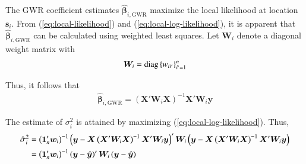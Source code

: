 \documentclass[authoryear, review, 11pt]{elsarticle}
\begin{document}
	The GWR coefficient estimates $\hat{\bm{\beta}}_{i,\text{GWR}}$ maximize the local likelihood at location $\bm{s}_i$. From (\ref{eq:local-likelihood}) and (\ref{eq:local-log-likelihood}), it is apparent that $\hat{\bm{\beta}}_{i,\text{GWR}}$ can be calculated using weighted least squares. Let $\bm{W}_i$ denote a diagonal weight matrix with
	\begin{align}
		\bm{W}_i =  {\rm diag}\left\{w_{ii'}\right\}_{i' = 1}^n
	\end{align}
	
	Thus, it follows that
	\begin{align}
		\hat{\bm{\beta}}_{i, \text{GWR}} = \left( \bm{X}'\bm{W}_i\bm{X} \right)^{-1} \bm{X}'\bm{W}_i\bm{y}
	\end{align}
	
	The estimate of $\sigma_i^2$ is attained by maximizing (\ref{eq:local-log-likelihood}). Thus,
	\begin{align}
		\hat{\sigma}^2_i &= \left(\bm{1}_n'\bm{w}_i \right)^{-1} \left(\bm{y}-\bm{X}\left(\bm{X}'\bm{W}_i\bm{X}\right)^{-1}\bm{X}'\bm{W}_i\bm{y}\right)' \bm{W}_i \left(\bm{y}-\bm{X}\left(\bm{X}'\bm{W}_i\bm{X}\right)^{-1}\bm{X}'\bm{W}_i\bm{y}\right) \notag \\
		&= \left(\bm{1}_n'\bm{w}_i \right)^{-1}  \left(\bm{y}-\hat{\bm{y}}\right)' \bm{W}_i \left(\bm{y}-\hat{\bm{y}}\right)
	\end{align}
	
\end{document}
